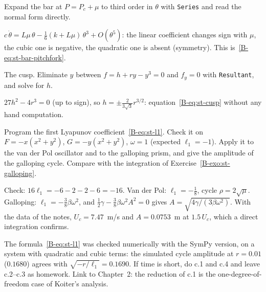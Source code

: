 \qc Expand the bar at $P = P_c + \mu$ to third order in $\theta$ with \texttt{Series}
and read the normal form directly.
\begin{answer}
$c\,\dot\theta = L\mu\,\theta - \tfrac16(k + L\mu)\,\theta^3 + O(\theta^5)$: the linear
coefficient changes sign with $\mu$, the cubic one is negative, the quadratic one is
absent (symmetry). This is~\eqref{B-eq:st-bar-pitchfork}.
\end{answer}

\qc The cusp. Eliminate $y$ between $f = h + ry - y^3 = 0$ and $f_y = 0$ with
\texttt{Resultant}, and solve for $h$.
\begin{answer}
$27h^2 - 4r^3 = 0$ (up to sign), so $h = \pm\tfrac{2}{3\sqrt3}r^{3/2}$:
equation~\eqref{B-eq:st-cusp} without any hand computation.
\end{answer}

\qc Program the first Lyapunov coefficient~\eqref{B-eq:st-l1}. Check it on
$F = -x(x^2+y^2)$, $G = -y(x^2+y^2)$, $\omega = 1$ (expected $\ell_1 = -1$). Apply it to
the van der Pol oscillator and to the galloping prism, and give the amplitude of the
galloping cycle. Compare with the integration of Exercise~\ref{B-exo:st-galloping}.
\begin{answer}
Check: $16\ell_1 = -6 - 2 - 2 - 6 = -16$. Van der Pol: $\ell_1 = -\tfrac18$, cycle
$\rho = 2\sqrt\mu$. Galloping: $\ell_1 = -\tfrac38\beta\omega^2$, and
$\tfrac12\gamma - \tfrac38\beta\omega^2A^2 = 0$ gives
$A = \sqrt{4\gamma/(3\beta\omega^2)}$. With the data of the notes, $U_c = 7.47$~m/s
and $A = 0.0753$~m at $1.5\,U_c$, which a direct integration confirms.

\end{answer}

\begin{instructor}
The formula~\eqref{B-eq:st-l1} was checked numerically with the SymPy version, on a
system with quadratic and cubic terms: the simulated cycle amplitude at $r = 0.01$
($0.1680$) agrees with $\sqrt{-r/\ell_1} = 0.1690$. If time is short, do c.1 and c.4
and leave c.2--c.3 as homework. Link to Chapter~2: the reduction of c.1 is the
one-degree-of-freedom case of Koiter's analysis.
\end{instructor}
